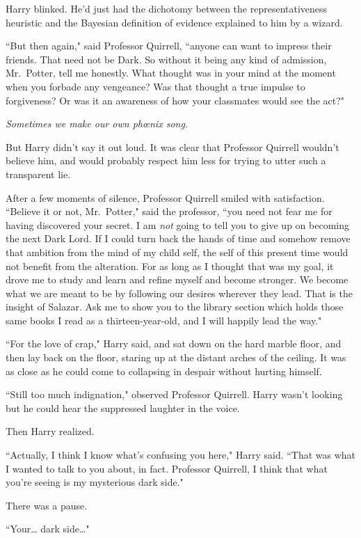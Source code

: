 Harry blinked. He'd just had the dichotomy between the representativeness heuristic and the Bayesian definition of evidence explained to him by a wizard.

``But then again," said Professor Quirrell, ``anyone can want to impress their friends. That need not be Dark. So without it being any kind of admission, Mr.~Potter, tell me honestly. What thought was in your mind at the moment when you forbade any vengeance? Was that thought a true impulse to forgiveness? Or was it an awareness of how your classmates would see the act?"

\emph{Sometimes we make our own phœnix song.}

But Harry didn't say it out loud. It was clear that Professor Quirrell wouldn't believe him, and would probably respect him less for trying to utter such a transparent lie.

After a few moments of silence, Professor Quirrell smiled with satisfaction. ``Believe it or not, Mr.~Potter," said the professor, ``you need not fear me for having discovered your secret. I am \emph{not} going to tell you to give up on becoming the next Dark Lord. If I could turn back the hands of time and somehow remove that ambition from the mind of my child self, the self of this present time would not benefit from the alteration. For as long as I thought that was my goal, it drove me to study and learn and refine myself and become stronger. We become what we are meant to be by following our desires wherever they lead. That is the insight of Salazar. Ask me to show you to the library section which holds those same books I read as a thirteen-year-old, and I will happily lead the way."

``For the love of crap," Harry said, and sat down on the hard marble floor, and then lay back on the floor, staring up at the distant arches of the ceiling. It was as close as he could come to collapsing in despair without hurting himself.

``Still too much indignation," observed Professor Quirrell. Harry wasn't looking but he could hear the suppressed laughter in the voice.

Then Harry realized.

``Actually, I think I know what's confusing you here," Harry said. ``That was what I wanted to talk to you about, in fact. Professor Quirrell, I think that what you're seeing is my mysterious dark side."

There was a pause.

``Your{\ldots} dark side{\ldots}"

